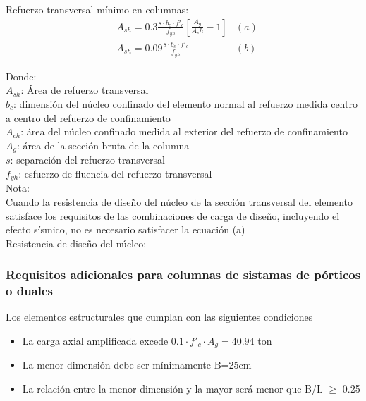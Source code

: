 \documentclass[12pt]{article}
\begin{document}
        Refuerzo transversal mínimo en columnas:
        \begin{align*}
            &A_{sh} = 0.3\frac{s \cdot b_c \cdot f'_c}{f_{yh}} \left[ \frac{A_g}{A_ch} -1  \right] &(a)\\
            &A_{sh} = 0.09 \frac{s \cdot b_c \cdot f'_c}{f_{yh}} &(b)
        \end{align*}

        Donde: \\
        $A_{sh}$: Área de refuerzo transversal\\
        $b_c$: dimensión del núcleo confinado del elemento normal al refuerzo medida centro a centro del refuerzo de confinamiento\\
        $A_{ch}$: área del núcleo confinado medida al exterior del refuerzo de confinamiento\\
        $A_g$: área de la sección bruta de la columna\\
        $s$: separación del refuerzo transversal\\
        $f_{yh}$: esfuerzo de fluencia del refuerzo transversal\\

        Nota:\\
        Cuando la resistencia de diseño del núcleo de la sección transversal del elemento satisface
        los requisitos de las combinaciones de carga de diseño, incluyendo el efecto sísmico, no
        es necesario satisfacer la ecuación (a)\\

        Resistencia de diseño del núcleo:

        \subsubsection{Requisitos adicionales para columnas de sistamas de pórticos o duales}
        Los elementos estructurales que cumplan con las siguientes condiciones 
        \begin{itemize}
            \item La carga axial amplificada excede $0.1 \cdot f'_c \cdot A_g = 40.94$ ton
            \item La menor dimensión debe ser mínimamente B=25cm
            \item La relación entre la menor dimensión y la mayor será menor que B/L $\geq$ 0.25      
        \end{itemize}
\end{document}
